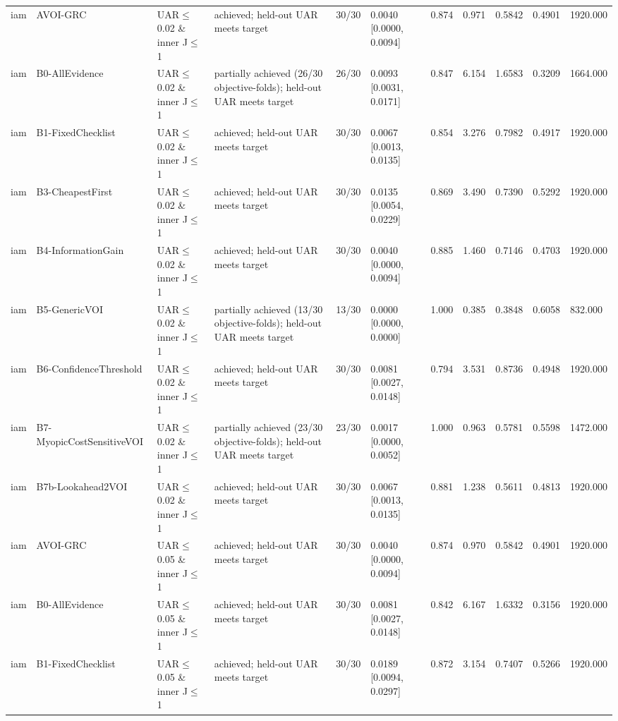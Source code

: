 \begin{table}[!ht]
{\begin{tabular}{lllllllllll}
iam & AVOI-GRC & UAR$\le$0.02 \& inner J$\le$1 & achieved; held-out UAR meets target & 30/30 & 0.0040 [0.0000, 0.0094] & 0.874 & 0.971 & 0.5842 & 0.4901 & 1920.000 \\
iam & B0-AllEvidence & UAR$\le$0.02 \& inner J$\le$1 & partially achieved (26/30 objective-folds); held-out UAR meets target & 26/30 & 0.0093 [0.0031, 0.0171] & 0.847 & 6.154 & 1.6583 & 0.3209 & 1664.000 \\
iam & B1-FixedChecklist & UAR$\le$0.02 \& inner J$\le$1 & achieved; held-out UAR meets target & 30/30 & 0.0067 [0.0013, 0.0135] & 0.854 & 3.276 & 0.7982 & 0.4917 & 1920.000 \\
iam & B3-CheapestFirst & UAR$\le$0.02 \& inner J$\le$1 & achieved; held-out UAR meets target & 30/30 & 0.0135 [0.0054, 0.0229] & 0.869 & 3.490 & 0.7390 & 0.5292 & 1920.000 \\
iam & B4-InformationGain & UAR$\le$0.02 \& inner J$\le$1 & achieved; held-out UAR meets target & 30/30 & 0.0040 [0.0000, 0.0094] & 0.885 & 1.460 & 0.7146 & 0.4703 & 1920.000 \\
iam & B5-GenericVOI & UAR$\le$0.02 \& inner J$\le$1 & partially achieved (13/30 objective-folds); held-out UAR meets target & 13/30 & 0.0000 [0.0000, 0.0000] & 1.000 & 0.385 & 0.3848 & 0.6058 & 832.000 \\
iam & B6-ConfidenceThreshold & UAR$\le$0.02 \& inner J$\le$1 & achieved; held-out UAR meets target & 30/30 & 0.0081 [0.0027, 0.0148] & 0.794 & 3.531 & 0.8736 & 0.4948 & 1920.000 \\
iam & B7-MyopicCostSensitiveVOI & UAR$\le$0.02 \& inner J$\le$1 & partially achieved (23/30 objective-folds); held-out UAR meets target & 23/30 & 0.0017 [0.0000, 0.0052] & 1.000 & 0.963 & 0.5781 & 0.5598 & 1472.000 \\
iam & B7b-Lookahead2VOI & UAR$\le$0.02 \& inner J$\le$1 & achieved; held-out UAR meets target & 30/30 & 0.0067 [0.0013, 0.0135] & 0.881 & 1.238 & 0.5611 & 0.4813 & 1920.000 \\
iam & AVOI-GRC & UAR$\le$0.05 \& inner J$\le$1 & achieved; held-out UAR meets target & 30/30 & 0.0040 [0.0000, 0.0094] & 0.874 & 0.970 & 0.5842 & 0.4901 & 1920.000 \\
iam & B0-AllEvidence & UAR$\le$0.05 \& inner J$\le$1 & achieved; held-out UAR meets target & 30/30 & 0.0081 [0.0027, 0.0148] & 0.842 & 6.167 & 1.6332 & 0.3156 & 1920.000 \\
iam & B1-FixedChecklist & UAR$\le$0.05 \& inner J$\le$1 & achieved; held-out UAR meets target & 30/30 & 0.0189 [0.0094, 0.0297] & 0.872 & 3.154 & 0.7407 & 0.5266 & 1920.000 \\

\end{tabular}}
\end{table}
